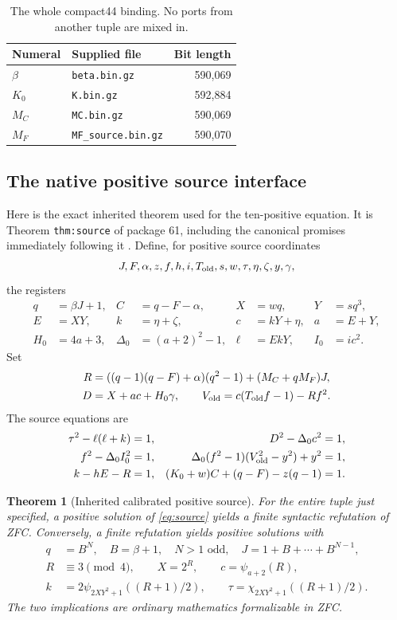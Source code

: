 \documentclass[11pt,letterpaper]{article}
\newtheorem{theorem}{Theorem}[section]
\theoremstyle{definition}
\theoremstyle{remark}
\numberwithin{equation}{section}
\begin{document}
\begin{table}[ht]
\centering\small
\begin{tabular}{@{}llr@{}}
\toprule
Numeral & Supplied file & Bit length\\
\midrule
$\beta$ & \texttt{beta.bin.gz} & 590,069\\
$K_0$ & \texttt{K.bin.gz} & 592,884\\
$M_C$ & \texttt{MC.bin.gz} & 590,069\\
$M_F$ & \texttt{MF\_source.bin.gz} & 590,070\\
\bottomrule
\end{tabular}
\caption{The whole compact44 binding. No ports from another tuple are mixed in.}
\end{table}

\subsection{The native positive source interface}

Here is the exact inherited theorem used for the ten-positive equation.
It is Theorem \texttt{thm:source} of package 61, including the canonical
promises immediately following it \cite{source61}. Define, for positive
source coordinates
\[
 J,F,\alpha,z,f,h,i,T_{\rm old},s,w,\tau,\eta,\zeta,y,\gamma,
\]
the registers
\begin{align*}
 q&=\beta J+1,& C&=q-F-\alpha,& X&=wq,& Y&=sq^3,\\
 E&=XY,& k&=\eta+\zeta,& c&=kY+\eta,& a&=E+Y,\\
 H_0&=4a+3,& \Delta_0&=(a+2)^2-1,& \ell&=EkY,& I_0&=ic^2.
\end{align*}
Set
\begin{align*}
 R&=((q-1)(q-F)+\alpha)(q^2-1)+(M_C+qM_F)J,\\
 D&=X+ac+H_0\gamma,\qquad
 V_{\rm old}=c(T_{\rm old}f-1)-Rf^2.
\end{align*}
The source equations are
\begin{align}
 \tau^2-\ell(\ell+k)&=1,&D^2-\Delta_0c^2&=1,\nonumber\\
 f^2-\Delta_0I_0^2&=1,&
 \Delta_0(f^2-1)(V_{\rm old}^2-y^2)+y^2&=1,\label{eq:source}\\
 k-hE-R&=1,&(K_0+w)C+(q-F)-z(q-1)&=1.\nonumber
\end{align}

\begin{theorem}[Inherited calibrated positive source]\label{thm:calibration}
For the entire tuple just specified, a positive solution of
\eqref{eq:source} yields a finite syntactic refutation of ZFC.
Conversely, a finite refutation yields positive solutions with
\begin{align*}
 q&=B^N,\quad B=\beta+1,\quad N>1\text{ odd},\quad
 J=1+B+\cdots+B^{N-1},\\
 R&\equiv3\pmod4,\qquad X=2^R,\qquad
 c=\psi_{a+2}(R),\\
 k&=2\psi_{2XY^2+1}((R+1)/2),\qquad
 \tau=\chi_{2XY^2+1}((R+1)/2).
\end{align*}
The two implications are ordinary mathematics formalizable in ZFC.
\end{theorem}
\end{document}
